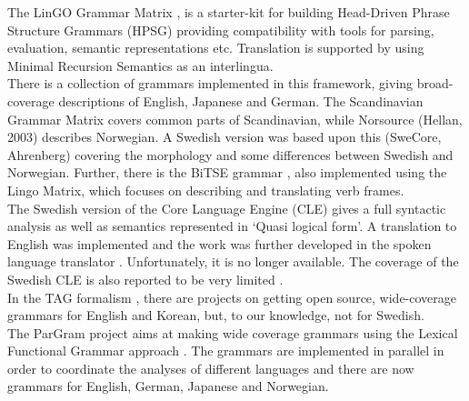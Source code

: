\documentclass{report}
\begin{document}

The LinGO Grammar Matrix \cite{matrix}, is a starter-kit for building Head-Driven Phrase
Structure Grammars \cite{hpsg} (HPSG) providing compatibility with tools for
parsing, evaluation, semantic representations etc.
Translation is supported by using Minimal Recursion
Semantics \cite{mrs} as an interlingua. \\
There is a collection of grammars implemented in this framework, giving broad-coverage
descriptions of %
English, Japanese and German. %
The Scandinavian Grammar Matrix \cite{scandmatrix} covers common parts of
Scandinavian, while Norsource (Hellan, 2003) describes Norwegian. A Swedish version
was based upon this (SweCore, Ahrenberg) covering the morphology and some
differences between Swedish and Norwegian. Further, there is the BiTSE 
grammar \cite{stymne}, also implemented using the Lingo Matrix,
which focuses on describing and translating verb frames.\\ %


The Swedish version of the Core Language Engine (CLE) \cite{gamback} %
gives a full syntactic analysis as well as semantics represented in `Quasi logical form'. A
translation to English  was implemented and the work was further developed in the spoken
language translator \cite{spoken}. Unfortunately, it is no longer available. The coverage of the Swedish
CLE is also reported to be very limited \cite[p. 134]{nivretrees}.\\

In the TAG formalism \cite{tag}, there are projects on getting open source, wide-coverage grammars
for English and Korean, but, to our knowledge, not for Swedish.  \\

The ParGram \cite{pargram} project aims at making wide coverage grammars using
the Lexical Functional Grammar approach \cite{lfg}.
The grammars are implemented in parallel in order to coordinate the analyses of
different languages and there are now grammars for English, German, Japanese and Norwegian. 
\end{document}
